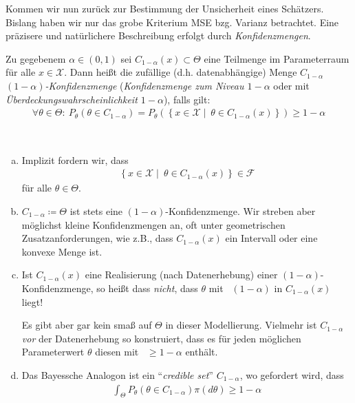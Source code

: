 \documentclass[a4paper]{scrartcl}
\begin{document}
		\begin{motivation}
			Kommen wir nun zurück zur Bestimmung der Unsicherheit eines Schätzers. Bislang haben wir nur das grobe Kriterium MSE bzg. Varianz betrachtet. Eine präzisere und natürlichere Beschreibung erfolgt durch \emph{Konfidenzmengen}.
		\end{motivation}
		\begin{definition}
			Zu gegebenem $\alpha\in (0,1)$ sei $C_{1-\alpha}(x)\subset\Theta$ eine Teilmenge im Parameterraum für alle $x\in \mathcal{X}$. Dann heißt die zufällige (d.h. datenabhängige) Menge $C_{1-\alpha}$ \emph{$(1-\alpha)$-Konfidenzmenge} (\emph{Konfidenzmenge zum Niveau $1-\alpha$} oder mit \emph{Überdeckungswahrscheinlichkeit $1-\alpha$}), falls gilt:
			\begin{align*}
				\forall\theta\in\Theta\colon~P_\theta\left(\theta\in C_{1-\alpha}\right)=P_\theta\left(\left\{x\in\mathcal{X}\middle|~\theta\in C_{1-\alpha}(x)\right\}\right)\ge 1-\alpha
			\end{align*}
		\end{definition}
		\begin{remark}~\\
			\begin{enumerate}[a)]
				\item Implizit fordern wir, dass
				\begin{align*}
					\left\{x\in\mathcal{X}\middle|~\theta\in C_{1-\alpha}(x)\right\}\in\mathscr{F}
				\end{align*}
				für alle $\theta\in\Theta$.
				\item $C_{1-\alpha}\coloneq\Theta$ ist stets eine $(1-\alpha)$-Konfidenzmenge. Wir streben aber möglichst kleine Konfidenzmengen an, oft unter geometrischen Zusatzanforderungen, wie z.B., dass $C_{1-\alpha}(x)$ ein Intervall oder eine konvexe Menge ist.
				\item Ist $C_{1-\alpha}(x)$ eine Realisierung (nach Datenerhebung) einer $(1-\alpha)$-Konfidenzmenge, so heißt dass \emph{nicht}, dass $\theta$ mit \Wk~$(1-\alpha)$ in $C_{1-\alpha}(x)$ liegt!
				
				Es gibt aber gar kein \Wk smaß auf $\Theta$ in dieser Modellierung. Vielmehr ist $C_{1-\alpha}$ \emph{vor} der Datenerhebung so konstruiert, dass es für jeden möglichen Parameterwert $\theta$ diesen mit \Wk~$\ge 1-\alpha$ enthält.
				\item Das Bayessche Analogon ist ein "`\emph{credible set}"' $C_{1-\alpha}$, wo gefordert wird, dass
				\begin{align*}
					\int_\Theta P_\theta\left(\theta\in C_{1-\alpha}\right)\pi(d\theta)\ge 1-\alpha
				\end{align*}
			\end{enumerate}
		\end{remark}
\end{document}
